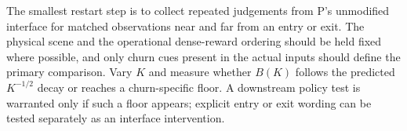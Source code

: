 \documentclass{article}
\begin{document}
The smallest restart step is to collect repeated judgements from P's unmodified interface for matched observations near and far from an entry or exit.  The physical scene and the operational dense-reward ordering should be held fixed where possible, and only churn cues present in the actual inputs should define the primary comparison.  Vary \(K\) and measure whether \(B(K)\) follows the predicted \(K^{-1/2}\) decay or reaches a churn-specific floor.  A downstream policy test is warranted only if such a floor appears; explicit entry or exit wording can be tested separately as an interface intervention.



\end{document}
